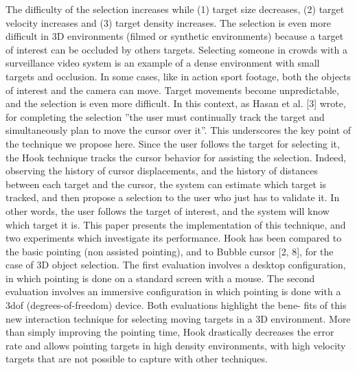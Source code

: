     
    
    
 The
difficulty of the selection increases while (1) target size decreases,
(2) target velocity increases and (3) target density increases. The
selection is even more difficult in 3D environments (filmed or synthetic
environments) because a target of interest can be occluded
by others targets. Selecting someone in crowds with a surveillance
video system is an example of a dense environment with small targets
and occlusion. In some cases, like in action sport footage, both
the objects of interest and the camera can move. Target movements
become unpredictable, and the selection is even more difficult.
In this context, as Hasan et al. [3] wrote, for completing the
selection ”the user must continually track the target and simultaneously
plan to move the cursor over it”. This underscores the key
point of the technique we propose here. Since the user follows the
target for selecting it, the Hook technique tracks the cursor behavior
for assisting the selection. Indeed, observing the history of cursor
displacements, and the history of distances between each target and
the cursor, the system can estimate which target is tracked, and then
propose a selection to the user who just has to validate it. In other
words, the user follows the target of interest, and the system will
know which target it is.
This paper presents the implementation of this technique, and
two experiments which investigate its performance. Hook has been
compared to the basic pointing (non assisted pointing), and to Bubble
cursor [2, 8], for the case of 3D object selection. The first evaluation
involves a desktop configuration, in which pointing is done
on a standard screen with a mouse. The second evaluation involves
an immersive configuration in which pointing is done with a 3dof
(degrees-of-freedom) device. Both evaluations highlight the bene-
fits of this new interaction technique for selecting moving targets in
a 3D environment. More than simply improving the pointing time,
Hook drastically decreases the error rate and allows pointing targets
in high density environments, with high velocity targets that are not
possible to capture with other techniques.


	
		

\clearpage
